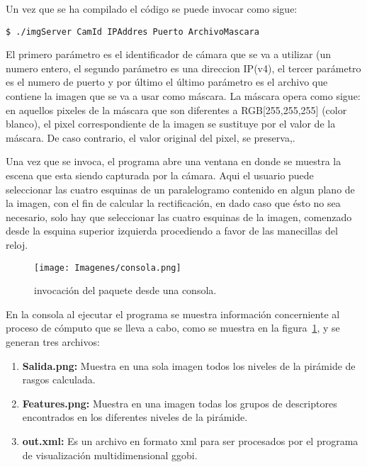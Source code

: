 \documentclass[12pt,letterpaper,notitlepage]{report}
\newlength{\spacing} \setlength{\spacing}{\baselineskip}
\newcommand{\nspace}[1]{\setlength{\baselineskip}{#1\spacing}}
\newenvironment{linespacing}[1]{\nspace{#1}}{}
\begin{document}
{\begin{linespacing}{1.5}
\smallskip

Un vez  que se  ha compilado  el código se  puede invocar  como sigue:
{\small
\begin{verbatim} 
$ ./imgServer CamId IPAddres Puerto ArchivoMascara
\end{verbatim} }

El primero parámetro es el identificador de cámara que se va a utilizar (un numero entero, el segundo parámetro es una direccion IP(v4), el tercer parámetro es el numero de puerto y por último el último parámetro es el archivo que contiene la imagen que se va a usar como máscara. La máscara opera como sigue: en aquellos pixeles de la máscara que son diferentes a RGB[255,255,255] (color blanco), el pixel correspondiente de la imagen se sustituye por el valor de la máscara. De caso contrario, el valor original del pixel, se preserva,.

Una vez que se invoca, el programa abre una ventana en donde se muestra la escena que esta siendo capturada por la cámara. Aqui el usuario puede seleccionar las cuatro esquinas de un paralelogramo contenido en algun plano de la imagen, con el fin de calcular la rectificación, en dado caso que ésto no sea necesario, solo hay que seleccionar las cuatro esquinas de la imagen, comenzado desde la esquina superior izquierda procediendo a favor de las manecillas del reloj.






\begin{figure}[htbp!]
  \centering
  \texttt{[image: Imagenes/consola.png]}
  \caption{invocación del paquete desde una consola.}
  \label{fig:consola}
\end{figure}


En la consola al ejecutar el programa se muestra información concerniente al proceso de cómputo que se lleva a cabo, como se muestra en la figura~\ref{fig:consola}, y se generan tres archivos:
\begin{enumerate}
\item {\bfseries Salida.png:} Muestra en una sola imagen todos los niveles de la pirámide de rasgos calculada. 
\item {\bfseries Features.png:} Muestra en una imagen todas los grupos de descriptores encontrados en los diferentes niveles de la pirámide.
\item {\bfseries out.xml:} Es un archivo en formato xml para ser procesados por el programa de visualización multidimensional ggobi.
\end{enumerate}


\end{linespacing}}
\end{document}
